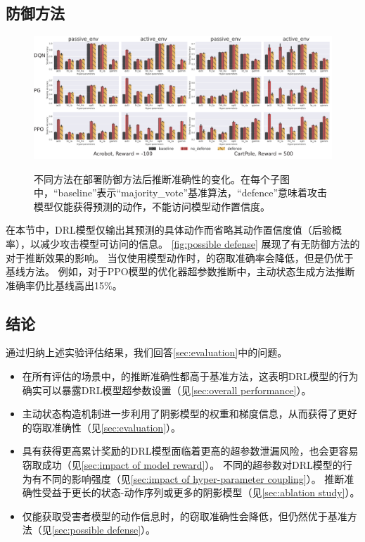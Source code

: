 \subsection{防御方法}
\label{sec:possible defense}
\begin{figure}[!ht]
    \centering
    \includegraphics[width=\hsize]{figure/drl_hypertheif/defense/defense-1.pdf}
    \label{fig:PPO CartPole defense}
    \caption{不同方法在部署防御方法后推断准确性的变化。在每个子图中，“baseline”表示“majority\_vote”基准算法，“defence”意味着攻击模型仅能获得预测的动作，不能访问模型动作置信度。
    }
    \label{fig:possible defense}
\end{figure}
在本节中，DRL模型仅输出其预测的具体动作而省略其动作置信度值（后验概率），以减少攻击模型可访问的信息。
\autoref{fig:possible defense} 展现了有无防御方法的对于\sysname 推断效果的影响。
当仅使用模型动作时，\sysname 的窃取准确率会降低，但是仍优于基线方法。
例如，对于PPO模型的优化器超参数推断中，主动状态生成方法推断准确率仍比基线高出15\%。

\subsection{结论}
\label{sec:takeaways}
通过归纳上述实验评估结果，我们回答\autoref{sec:evaluation}中的问题。
\begin{itemize}
    \item 在所有评估的场景中，\sysname 的推断准确性都高于基准方法，这表明DRL模型的行为确实可以暴露DRL模型超参数设置（见\autoref{sec:overall performance}）。
    \item 主动状态构造机制进一步利用了阴影模型的权重和梯度信息，从而获得了更好的窃取准确性（见\autoref{sec:evaluation}）。
    \item 具有获得更高累计奖励的DRL模型面临着更高的超参数泄漏风险，\sysname 也会更容易窃取成功（见\autoref{sec:impact of model reward}）。
    不同的超参数对DRL模型的行为有不同的影响强度（见\autoref{sec:impact of hyper-parameter coupling}）。
    \sysname 推断准确性受益于更长的状态-动作序列或更多的阴影模型（见\autoref{sec:ablation study}）。
    \item 仅能获取受害者模型的动作信息时，\sysname 的窃取准确性会降低，但仍然优于基准方法（见\autoref{sec:possible defense}）。
\end{itemize}

